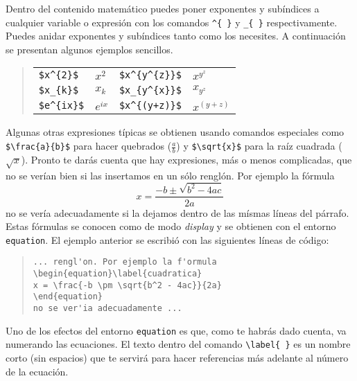 Dentro  del contenido matem\'atico puedes poner exponentes y sub\'indices a 
cualquier variable o expresi\'on con los comandos \verb|^{ }| y \verb|_{ }| respectivamente. Puedes
anidar exponentes y sub\'indices tanto como los necesites. A continuaci\'on se presentan
algunos ejemplos sencillos.

\begin{quote}
\begin{tabular}{ll@{\qquad\qquad}ll}
\verb|$x^{2}$|  & $x^{2}$  & \verb|$x^{y^{z}}$| & $x^{y^{z}}$ \\[4pt]
\verb|$x_{k}$|  & $x_{k}$  & \verb|$x_{y^{x}}$| & $x_{y^{z}}$ \\[4pt]
\verb|$e^{ix}$| & $e^{ix}$ & \verb|$x^{(y+z)}$| & $x^{(y+z)}$ \\
\end{tabular}
\end{quote}

Algunas otras expresiones t\'ipicas se obtienen usando comandos especiales como
\verb|$\frac{a}{b}$| para hacer quebrados ($\frac{a}{b}$) y \verb|$\sqrt{x}$| para
la ra\'iz cuadrada ($\sqrt{x}$). Pronto te dar\'as cuenta que hay expresiones, m\'as o
menos complicadas, que no se ver\'ian bien si las insertamos en un s\'olo rengl\'on. Por
ejemplo la f\'ormula
\begin{equation}\label{cuadratica}
x = \frac{-b \pm \sqrt{b^2 - 4ac}}{2a}
\end{equation}
no se ver\'ia adecuadamente si la dejamos dentro de las m\'ismas l\'ineas del p\'arrafo. Estas
f\'ormulas se conocen como de modo \emph{display} y se obtienen con el entorno
\texttt{equation}. El ejemplo anterior se escribi\'o con las siguientes l\'ineas
de c\'odigo:

\begin{quote}
\begin{verbatim}
... rengl'on. Por ejemplo la f'ormula
\begin{equation}\label{cuadratica}
x = \frac{-b \pm \sqrt{b^2 - 4ac}}{2a}
\end{equation}
no se ver'ia adecuadamente ...
\end{verbatim}
\end{quote}

Uno de los efectos del entorno \texttt{equation} es que, como te habr\'as dado cuenta,
va numerando las ecuaciones. El texto dentro del comando \verb|\label{ }| es un nombre
corto (sin espacios) que te servir\'a para hacer referencias m\'as adelante al n\'umero de la
ecuaci\'on.

